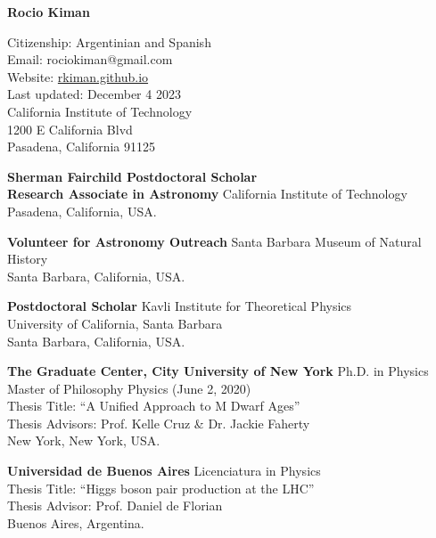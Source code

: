 \documentclass[10pt]{cv}
\newcommand{\firstpagestyle}{empty} %
\begin{document}
\thispagestyle{\firstpagestyle} 
\begin{center}
{\LARGE \textbf{\sc Rocio Kiman}}\\
\bigskip
\bigskip
\end{center}
\normalsize
  
\addresses
{
Citizenship: Argentinian and Spanish\\
Email: rociokiman@gmail.com\\
Website: \href{https://rkiman.github.io}{rkiman.github.io}\\
Last updated: December 4 2023\\
}
{
California Institute of Technology\\
1200 E California Blvd\\
Pasadena, California 91125
}

\begin{llist}


\textbf{Sherman Fairchild Postdoctoral Scholar\\Research Associate in Astronomy}
California Institute of Technology \\
Pasadena, California, USA.

\textbf{Volunteer for Astronomy Outreach}
Santa Barbara Museum of Natural History \\
Santa Barbara, California, USA.


\textbf{Postdoctoral Scholar}
Kavli Institute for Theoretical Physics \\
University of California, Santa Barbara \\
Santa Barbara, California, USA.


\textbf{The Graduate Center, City University of New York}
Ph.D. in Physics\\
Master of Philosophy Physics (June 2, 2020)\\
Thesis Title: ``A Unified Approach to M Dwarf Ages''\\
Thesis Advisors: Prof. Kelle Cruz \& Dr. Jackie Faherty \\
New York, New York, USA.

\textbf{Universidad de Buenos Aires}
Licenciatura in Physics\\
Thesis Title: ``Higgs boson pair production at the LHC''\\
Thesis Advisor: Prof. Daniel de Florian\\
Buenos Aires, Argentina.




\end{llist}
\end{document}

